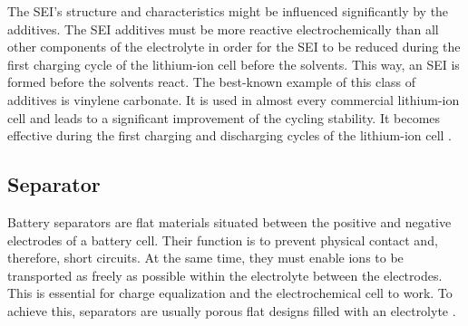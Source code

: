 The SEI's structure and characteristics might be influenced significantly by the additives. The SEI additives must be more reactive electrochemically than all other components of the electrolyte in order for the SEI to be reduced during the first charging cycle of the lithium-ion cell before the solvents. This way, an SEI is formed before the solvents react.
The best-known example of this class of additives is vinylene carbonate. It is used in almost every commercial lithium-ion cell and leads to a significant improvement of the cycling stability. It becomes effective during the first charging and discharging cycles of the lithium-ion cell \cite{xu2004nonaqueous}.

\subsection{Separator}
\label{sec:separator}
Battery separators are flat materials situated between the positive and negative electrodes of a battery cell. Their function is to prevent physical contact and, therefore, short circuits. At the same time, they must enable ions to be transported as freely as possible within the electrolyte between the electrodes. This is essential for charge equalization and the electrochemical cell to work. To achieve this, separators are usually porous flat designs filled with an electrolyte \cite{korthauer2018lithium}.

